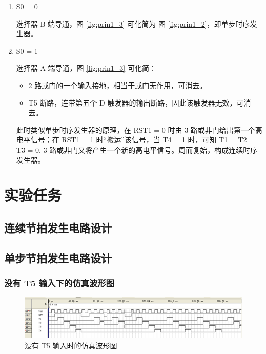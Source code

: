 \begin{enumerate}
    \item S0 = 0
    
    选择器 B 端导通，图 \ref{fig:prin1_3} 可化简为 图 \ref{fig:prin1_2}，即单步时序发生器。
    
    \item S0 = 1
    
    选择器 A 端导通，图 \ref{fig:prin1_3} 可化简：
    
    \begin{itemize}
        \item 2 路或门的一个输入接地，相当于或门无作用，可消去。
        \item T5 断路，连带第五个 D 触发器的输出断路，因此该触发器无效，可消去。
    \end{itemize}
    
    此时类似单步时序发生器的原理，在 RST1 = 0 时由 3 路或非门给出第一个高电平信号；在 RST1 = 1 时“搬运”该信号，当 T4 = 1 时，可知 T1 = T2 = T3 = 0, 3 路或非门又将产生一个新的高电平信号。周而复始，构成连续时序发生器。
        
\end{enumerate}

\section{实验任务}

\subsection{连续节拍发生电路设计}

\subsection{单步节拍发生电路设计}

\subsubsection{没有 T5 输入下的仿真波形图}

\begin{figure}[h]
\centering
\includegraphics[width=\textwidth]{images/wave1_2_1.png}
\caption{没有 T5 输入时的仿真波形图}
\label{fig:wave1_2_1}
\end{figure}

